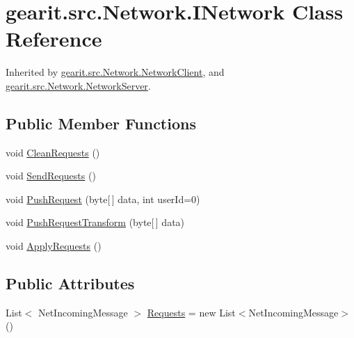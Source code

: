\hypertarget{classgearit_1_1src_1_1_network_1_1_i_network}{\section{gearit.\+src.\+Network.\+I\+Network Class Reference}
\label{classgearit_1_1src_1_1_network_1_1_i_network}
}


Inherited by \hyperlink{classgearit_1_1src_1_1_network_1_1_network_client}{gearit.\+src.\+Network.\+Network\+Client}, and \hyperlink{classgearit_1_1src_1_1_network_1_1_network_server}{gearit.\+src.\+Network.\+Network\+Server}.

\subsection*{Public Member Functions}
\begin{DoxyCompactItemize}
\item 
void \hyperlink{classgearit_1_1src_1_1_network_1_1_i_network_a07a9db03d351717ff5e40458b147fbc6}{Clean\+Requests} ()
\item 
void \hyperlink{classgearit_1_1src_1_1_network_1_1_i_network_a11a53f0b7fb75b7e0661319c245745bf}{Send\+Requests} ()
\item 
void \hyperlink{classgearit_1_1src_1_1_network_1_1_i_network_a916413379181b54854fbbe23887fcd7b}{Push\+Request} (byte\mbox{[}$\,$\mbox{]} data, int user\+Id=0)
\item 
void \hyperlink{classgearit_1_1src_1_1_network_1_1_i_network_a8c4e1b77735f208840d328627bc8db25}{Push\+Request\+Transform} (byte\mbox{[}$\,$\mbox{]} data)
\item 
void \hyperlink{classgearit_1_1src_1_1_network_1_1_i_network_a32c2866c65eb362b0c51486ce07c3bba}{Apply\+Requests} ()
\end{DoxyCompactItemize}
\subsection*{Public Attributes}
\begin{DoxyCompactItemize}
\item 
List$<$ Net\+Incoming\+Message $>$ \hyperlink{classgearit_1_1src_1_1_network_1_1_i_network_a05731bbb209111cf1873385a14f0ad11}{Requests} = new List$<$Net\+Incoming\+Message$>$()
\end{DoxyCompactItemize}
